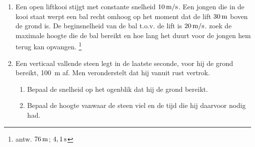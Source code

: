 \begin{enumerate}
\item Een open liftkooi stijgt met constante snelheid $10\rm\,m/s$.  Een jongen
die in de kooi staat werpt een bal recht omhoog op het moment dat de
lift $30\rm\,m$ boven de grond is. De beginsnelheid van de bal
t.o.v. de lift is $20\rm\,m/s$. zoek de maximale hoogte die de bal
bereikt en hoe lang het duurt voor de jongen hem terug kan opvangen.
\footnote{antw. $76\rm\,m$; $4,1\rm\,s$}



\item Een verticaal vallende steen legt in de laatste seconde, voor hij de grond bereikt, \SI{100}{m} af. Men veronderstelt dat hij vanuit rust vertrok.
\begin{enumerate}
\item Bepaal de snelheid op het ogenblik dat hij de grond bereikt.
\item Bepaal de hoogte vanwaar de steen viel en de tijd die hij daarvoor nodig had.
\end{enumerate}
\end{enumerate}
